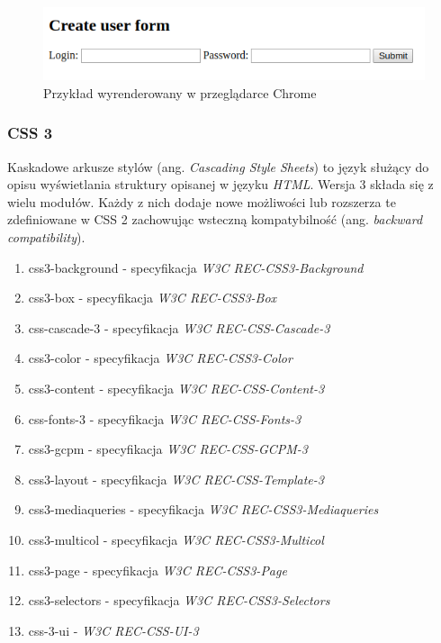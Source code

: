 \documentclass[polish, twoside, 12pt]{mwart}
\begin{document}
\begin{figure}[ht]
  \includegraphics[width=\textwidth]{html-chrome.png}
	\caption{Przykład wyrenderowany w przeglądarce Chrome}
\end{figure}

\subsubsection{CSS 3}

Kaskadowe arkusze stylów (ang. \emph{Cascading Style Sheets}) to język służący do opisu wyświetlania struktury opisanej w języku \emph{HTML}. Wersja 3 składa się z wielu modułów. Każdy z nich dodaje nowe możliwości lub rozszerza te zdefiniowane w CSS 2 zachowując wsteczną kompatybilność (ang. \emph{backward compatibility}).

\begin{enumerate}
  \item css3-background - specyfikacja \emph{W3C REC-CSS3-Background} \cite{w3c-rec-css3-background}
  \item css3-box - specyfikacja \emph{W3C REC-CSS3-Box} \cite{w3c-rec-css3-box}
  \item css-cascade-3 - specyfikacja \emph{W3C REC-CSS-Cascade-3} \cite{w3c-rec-css3-cascade}
  \item css3-color - specyfikacja \emph{W3C REC-CSS3-Color} \cite{w3c-rec-css3-color}
  \item css3-content - specyfikacja \emph{W3C REC-CSS-Content-3} \cite{w3c-rec-css3-content}
  \item css-fonts-3 - specyfikacja \emph{W3C REC-CSS-Fonts-3} \cite{w3c-rec-css3-fonts}
  \item css3-gcpm - specyfikacja \emph{W3C REC-CSS-GCPM-3} \cite{w3c-rec-css3-gcpm}
  \item css3-layout - specyfikacja \emph{W3C REC-CSS-Template-3} \cite{w3c-rec-css3-template}
  \item css3-mediaqueries - specyfikacja \emph{W3C REC-CSS3-Mediaqueries} \cite{w3c-rec-css3-mediaqueries}
  \item css3-multicol - specyfikacja \emph{W3C REC-CSS3-Multicol} \cite{w3c-rec-css3-multicol}
  \item css3-page - specyfikacja \emph{W3C REC-CSS3-Page} \cite{w3c-rec-css3-page}
  \item css3-selectors - specyfikacja \emph{W3C REC-CSS3-Selectors} \cite{w3c-rec-css3-selectors}
  \item css-3-ui - \emph{W3C REC-CSS-UI-3} \cite{w3c-rec-css3-ui}
\end{enumerate}
\end{document}
